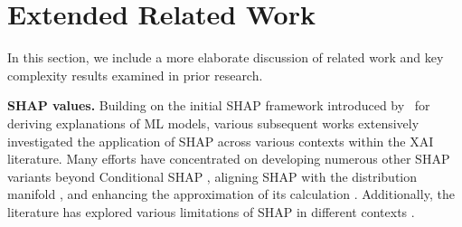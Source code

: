 \section{Extended Related Work}

In this section, we include a more elaborate discussion of related work and key complexity results examined in prior research. 

\textbf{SHAP values.} Building on the initial SHAP framework introduced by~\citep{lundberg2017} for deriving explanations of ML models, various subsequent works extensively investigated the application of SHAP across various contexts within the XAI literature. Many efforts have concentrated on developing numerous other SHAP variants beyond Conditional SHAP \citep{sundararajan20b, janzing20a, heskes2020causal}, aligning SHAP with the distribution manifold \citep{frye2020shapley, taufiq2023manifold}, and enhancing the approximation of its calculation \citep{fumagalli2024shap, sundararajan2020shapley, burgess2021approximating, kwon2021efficient}. Additionally, the literature has explored various limitations of SHAP in different contexts \citep{fryer2021shapley, huang2024failings, kumar2020problems, marques2024explainability}.




